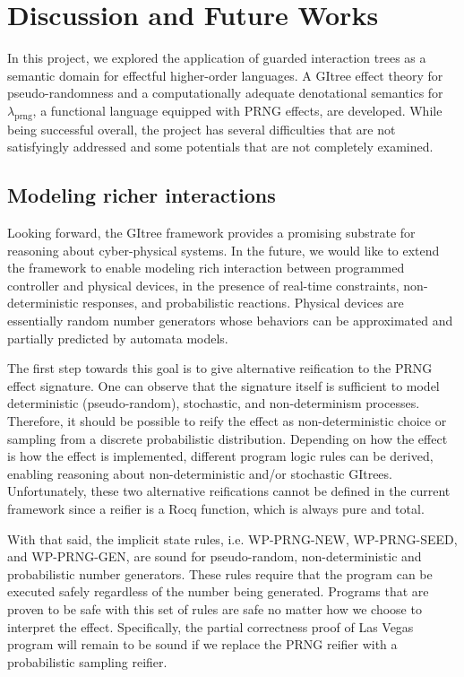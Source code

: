 \documentclass{article}
\theoremstyle{definition}
\theoremstyle{plain}
\theoremstyle{remark}
\newcommand{\prng}{\mathrm{prng}}
\begin{document}
\section{Discussion and Future Works}

In this project, we explored the application of guarded interaction trees as a semantic domain for effectful higher-order languages.
A GItree effect theory for pseudo-randomness and a computationally adequate denotational semantics for \(\lambda_\prng\), a functional language equipped with PRNG effects, are developed.
While being successful overall, the project has several difficulties that are not satisfyingly addressed and some potentials that are not completely examined.

\subsection{Modeling richer interactions}

Looking forward, the GItree framework provides a promising substrate for reasoning about cyber-physical systems.
In the future, we would like to extend the framework to enable modeling rich interaction between programmed controller and physical devices, in the presence of real-time constraints, non-deterministic responses, and probabilistic reactions.
Physical devices are essentially random number generators whose behaviors can be approximated and partially predicted by automata models.\par
The first step towards this goal is to give alternative reification to the PRNG effect signature.
One can observe that the signature itself is sufficient to model deterministic (pseudo-random), stochastic, and non-determinism processes.
Therefore, it should be possible to reify the effect as non-deterministic choice or sampling from a discrete probabilistic distribution. Depending on how the effect is how the effect is implemented, different program logic rules can be derived, enabling reasoning about non-deterministic and/or stochastic GItrees. Unfortunately, these two alternative reifications cannot be defined in the current framework since a reifier is a Rocq function, which is always pure and total.\par
With that said, the implicit state rules, i.e. \textsf{WP-PRNG-NEW}, \textsf{WP-PRNG-SEED}, and \textsf{WP-PRNG-GEN}, are sound for pseudo-random, non-deterministic and probabilistic number generators. These rules require that the program can be executed safely regardless of the number being generated. Programs that are proven to be safe with this set of rules are safe no matter how we choose to interpret the effect. Specifically, the partial correctness proof of Las Vegas program will remain to be sound if we replace the PRNG reifier with a probabilistic sampling reifier.\par
\end{document}

